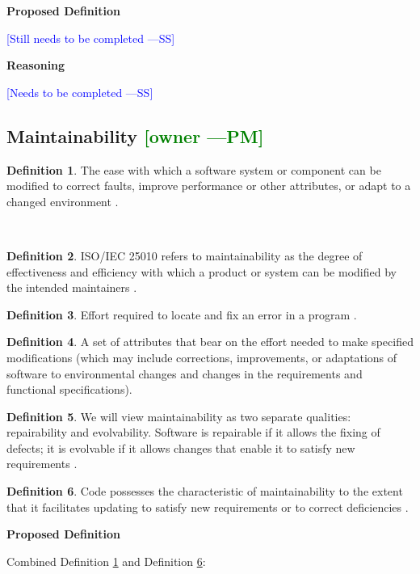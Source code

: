 \documentclass[letterpaper,cleveref]{lipics-v2019}
\newcommand{\authornote}[3]{\textcolor{#1}{[#3 ---#2]}}
\newcommand{\authornote}[3]{}
\newcommand{\wss}[1]{\authornote{blue}{SS}{#1}} %
\newcommand{\pmi}[1]{\authornote{green}{PM}{#1}} %
\theoremstyle{definition}
\newtheorem{defn}{Definition}
\begin{document}
\noindent \textbf{Proposed Definition}

\wss{Still needs to be completed}

\noindent \textbf{Reasoning}

\wss{Needs to be completed}

\subsection{Maintainability \pmi{owner}}

\begin{defn} \label{MaintainabilityDefnSelected1}
The ease with which a software system or component can be modified to correct
faults, improve performance or other attributes, or adapt to a changed
environment \citep{IEEEStdGlossarySET1990}. 
\end{defn}\
\begin{defn}
ISO/IEC 25010 refers to maintainability as the degree of effectiveness and
efficiency with which a product or system can be modified by the intended
maintainers \citep{ISO/IEC25010}.
\end{defn}
\begin{defn}
Effort required to locate and fix an error in a program
\citep{pressman2005software}.
\end{defn}
\begin{defn}
A set of attributes that bear on the effort needed to make specified
modifications (which may include corrections, improvements, or adaptations of
software to environmental changes and changes in the requirements and functional
specifications)\citep{pfleeger2006software}.
\end{defn}
\begin{defn}
We will view maintainability as two separate qualities: repairability and
evolvability. Software is repairable if it allows the fixing of defects; it is
evolvable if it allows changes that enable it to satisfy new requirements
\citep{ghezzi1991fundamentals}.
\end{defn}
\begin{defn} \label{MaintainabilityDefnSelected2}
Code possesses the characteristic of maintainability to the extent that it
facilitates updating to satisfy new requirements or to correct deficiencies
\citep{boehm2007software}.
\end{defn}

\noindent \textbf{Proposed Definition}

Combined Definition
\ref{MaintainabilityDefnSelected1} and Definition
\ref{MaintainabilityDefnSelected2}:
\end{document}
